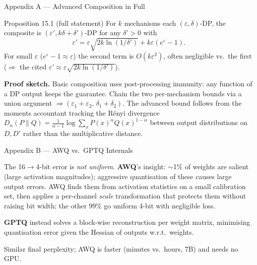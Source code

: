 \documentclass[9pt,t]{beamer}
\begin{document}

\begin{frame}[noframenumbering]{Appendix A --- Advanced Composition in Full}
\begin{block}{Proposition 15.1 (full statement)}
For $k$ mechanisms each $(\varepsilon,\delta)$-DP, the composite is
$(\varepsilon', k\delta+\delta')$-DP for any $\delta'>0$ with
\[
\varepsilon' = \varepsilon\sqrt{2k\ln(1/\delta')} + k\varepsilon(e^{\varepsilon}-1).
\]
For small $\varepsilon$ ($e^{\varepsilon}-1\approx\varepsilon$) the second term is
$O(k\varepsilon^2)$, often negligible vs.\ the first ($\Rightarrow$ the cited
$\varepsilon'\approx\varepsilon\sqrt{2k\ln(1/\delta')}$).
\end{block}

\medskip
\textbf{Proof sketch.} Basic composition uses post-processing immunity: any function
of a DP output keeps the guarantee. Chain the two per-mechanism bounds via a union
argument $\Rightarrow (\varepsilon_1{+}\varepsilon_2,\,\delta_1{+}\delta_2)$. The
advanced bound follows from the moments accountant tracking the R\'enyi divergence
$D_\alpha(P\|Q)=\frac{1}{\alpha-1}\log\sum_x P(x)^\alpha Q(x)^{1-\alpha}$ between
output distributions on $D, D'$ rather than the multiplicative distance.
\end{frame}

\begin{frame}[noframenumbering]{Appendix B --- AWQ vs.\ GPTQ Internals}
\begin{underhood}
The 16$\to$4-bit error is \emph{not uniform}. \textbf{AWQ}'s insight: $\sim$1\% of
weights are salient (large activation magnitudes); aggressive quantisation of these
causes large output errors. AWQ finds them from activation statistics on a small
calibration set, then applies a per-channel \emph{scale} transformation that protects
them without raising bit width; the other 99\% go uniform 4-bit with negligible loss.

\medskip
\textbf{GPTQ} instead solves a block-wise reconstruction per weight matrix,
minimising quantisation error given the Hessian of outputs w.r.t.\ weights.

\medskip
Similar final perplexity; AWQ is faster (minutes vs.\ hours, 7B) and needs no GPU.
\end{underhood}
\end{frame}
\end{document}
